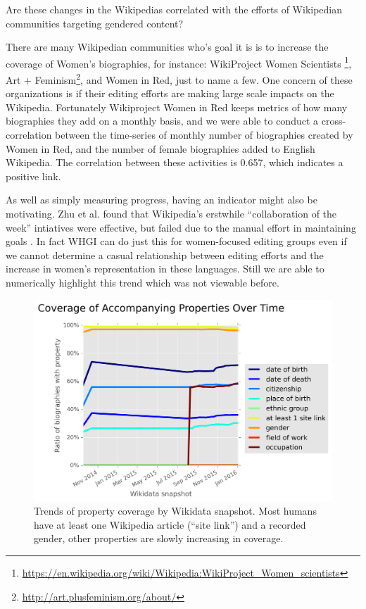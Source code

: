 \documentclass{sig-alternate-05-2015}
\begin{document}
Are these changes in the Wikipedias correlated with the efforts of Wikipedian communities targeting gendered content?

There are many Wikipedian communities who's goal it is is to increase the coverage of Women's biographies, for instance: Wiki\-Project Women Scientists \footnote{\url{https://en.wikipedia.org/wiki/Wikipedia:WikiProject_Women_scientists}}, Art + Feminism\footnote{\url{http://art.plusfeminism.org/about/}}, and Women in Red, just to name a few. One concern of these organizations is if their editing efforts are making large scale impacts on the Wikipedia. Fortunately Wikiproject Women in Red keeps metrics of how many biographies they add on a monthly basis, and we were able to conduct a cross-correlation between the time-series of monthly number of biographies created by Women in Red, and the number of female biographies added to English Wikipedia. The correlation between these activities is 0.657, which indicates a positive link. 

As well as simply measuring progress, having an indicator might also be motivating. Zhu et al. found that Wikipedia's erstwhile ``collaboration of the week'' intiatives were effective, but failed due to the manual effort in maintaining goals \cite{zhu_organizing_2012}. In fact WHGI can do just this for women-focused editing groups even if we cannot determine a casual relationship between editing efforts and the increase in women's representation in these languages. Still we are able to numerically highlight this trend which was not viewable before.

\begin{figure}
\includegraphics[width=\columnwidth]{figures/additionalprops.png} 
\caption{Trends of property coverage by Wikidata snapshot. Most humans have at least one Wikipedia article (``site link'') and a recorded gender, other properties are slowly increasing in coverage.}
\label{fig:accompanying}
\end{figure}
\end{document}
